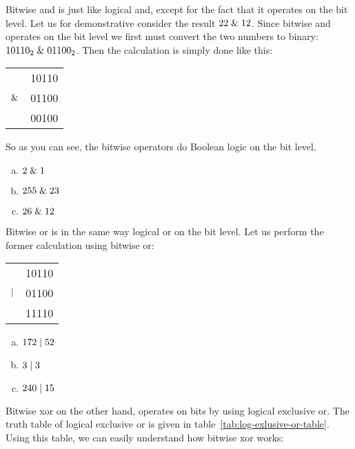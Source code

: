 Bitwise and is just like logical and, except for the fact that it
operates on the bit level. Let us for demonstrative consider the
result $22 \mathrel{\&} 12$. Since bitwise and operates on the bit level we
first must convert the two numbers to binary:\mbox{ $\mbox{\ensuremath{10110_2}}
  \mathrel{\&} \mbox{\ensuremath{01100_2}}$}. Then the calculation is simply done like
this:

\begin{center}
  \begin{tabular}{lr}
    & 10110  \\
    $\mathrel{\&}$ & 01100 \\
    \hline
    & 00100 \\
  \end{tabular}
\end{center}

So as you can see, the bitwise operators do Boolean logic on the bit
level.

\begin{Exercise}[label={bitand}]

  \begin{enumerate}[(a)]
  \item $2 \mathrel{\&} 1$
  \item $255 \mathrel{\&} 23$
  \item $26 \mathrel{\&} 12$
  \end{enumerate}
\end{Exercise}

Bitwise or is in the same way logical or on the bit level. Let us
perform the former calculation using bitwise or:

\begin{center}
  \begin{tabular}{lr}
    & 10110  \\
    $\mathrel{|}$ & 01100 \\
    \hline
    & 11110 \\
  \end{tabular}
\end{center}

\begin{Exercise}[label={bitor}]
  \begin{enumerate}[(a)]
  \item $172 \mathrel{|} 52$
  \item $3 \mathrel{|} 3$
  \item $240 \mathrel{|} 15$
  \end{enumerate}
\end{Exercise}

Bitwise xor on the other hand, operates on bits by using logical
exclusive or. The truth table of logical exclusive or is given in
table~\ref{tab:log-exlusive-or-table}. Using this table, we can easily
understand how bitwise xor works:

